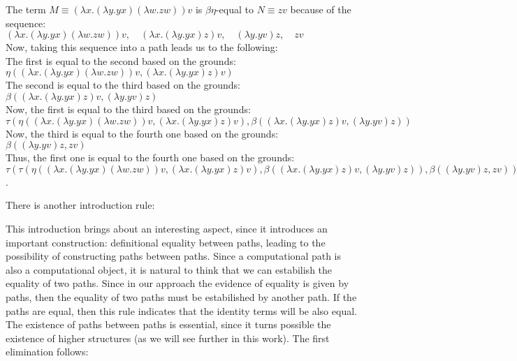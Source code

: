\documentclass{entcs} \usepackage{entcsmacro}
\begin{document}
\begin{example}\label{examplepath}
The term $M\equiv(\lambda x.(\lambda y.yx)(\lambda w.zw))v$ is $\beta\eta$-equal to $N\equiv zv$ because of the sequence:\\
$(\lambda x.(\lambda y.yx)(\lambda w.zw))v, \quad  (\lambda x.(\lambda y.yx)z)v, \quad   (\lambda y.yv)z , \quad zv$\\
Now, taking this sequence into a path leads us to the following:\\
The first is equal to the second based on the grounds:\\
$\eta((\lambda x.(\lambda y.yx)(\lambda w.zw))v,(\lambda x.(\lambda y.yx)z)v)$\\
The second is equal to the third based on the grounds:\\
$\beta((\lambda x.(\lambda y.yx)z)v,(\lambda y.yv)z)$\\
Now, the first is equal to the third based on the grounds:\\
$\tau(\eta((\lambda x.(\lambda y.yx)(\lambda w.zw))v,(\lambda x.(\lambda y.yx)z)v),\beta((\lambda x.(\lambda y.yx)z)v,(\lambda y.yv)z))$\\
Now, the third is equal to the fourth one based on the grounds:\\
$\beta((\lambda y.yv)z,zv)$\\
Thus, the first one is equal to the fourth one based on the grounds:\\
$\tau(\tau(\eta((\lambda x.(\lambda y.yx)(\lambda w.zw))v,(\lambda x.(\lambda y.yx)z)v),\beta((\lambda x.(\lambda y.yx)z)v,(\lambda y.yv)z)),\beta((\lambda y.yv)z,zv)))$.
\end{example}


There is another introduction rule:

\bigskip
\begin{center}
\begin{bprooftree}
\end{bprooftree}
\end{center}

\bigskip

This introduction brings about an interesting aspect, since it introduces an important construction: definitional equality between paths, leading to the possibility of constructing paths between paths. Since a computational path is also a computational object, it is natural to think that we can estabilish the equality of two paths. Since in our approach the evidence of equality is given by paths, then the equality of two paths must be estabilished by another path. If the paths are equal, then this rule indicates that the identity terms will be also equal. The existence of paths between paths is essential, since it turns possible the existence of higher structures (as we will see further in this work). The first elimination follows:
\end{document}
